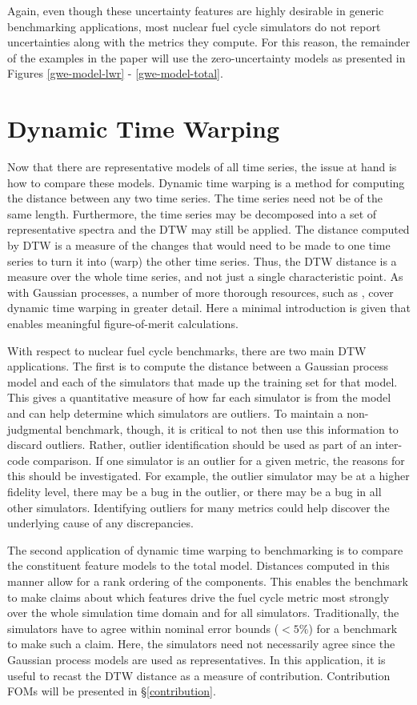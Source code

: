 \documentclass{ntmanuscript}
\begin{document}
Again, even though these uncertainty features are highly desirable in
generic benchmarking applications, most nuclear fuel
cycle simulators do not report uncertainties along with the metrics they compute.
For this reason, the remainder of the examples in the paper will use the
zero-uncertainty models as presented in Figures \ref{gwe-model-lwr} -
\ref{gwe-model-total}.

\clearpage
\section{Dynamic Time Warping}
\label{dtw}

Now that there are representative models of all time series, the issue at hand is
how to compare these models. Dynamic time warping
is a method for computing the distance between any two time series. The time
series need not be of the same length.  Furthermore, the time series may be
decomposed into a set of representative spectra and the DTW may still be applied.
The distance computed by DTW is a measure of the changes that would need to be
made to one time series to turn it into (warp) the other time series. Thus,
the DTW distance is a measure over the whole time series, and not just a
single characteristic point. As with Gaussian processes, a number of more thorough
resources, such as \cite{muller}, cover dynamic time warping in greater detail.
Here a minimal introduction is given that enables meaningful figure-of-merit
calculations.

With respect to nuclear fuel cycle benchmarks, there are two main DTW applications.
The first is to compute the distance between a Gaussian process model and each of
the simulators that made up the training set for that model. This gives a
quantitative measure
of how far each simulator is from the model and can help determine which
simulators are outliers. To maintain a non-judgmental benchmark, though, it is
critical to not then use this information to discard outliers.  Rather, outlier
identification should be used as part of an inter-code comparison. If one simulator
is an outlier for a given metric, the reasons for this should be investigated.
For example, the outlier simulator may be at a higher fidelity level, there may be
a bug in the outlier, or there may be a bug in all other simulators. Identifying
outliers for many metrics could help discover the underlying cause of any
discrepancies.

The second application of dynamic time warping to benchmarking is to compare
the constituent
feature models to the total model.  Distances computed in this manner allow
for a rank ordering of the components.  This enables the benchmark to make claims
about which features drive the fuel cycle metric most strongly over the whole
simulation time domain and for all simulators. Traditionally, the simulators have
to agree
within nominal error bounds ($<5\%$) for a benchmark to make such a claim.  Here,
the simulators need not necessarily agree since the Gaussian process models are
used as representatives.  In this application, it is useful to recast the DTW
distance as a measure of contribution.  Contribution FOMs will be presented in
\S\ref{contribution}.
\end{document}

